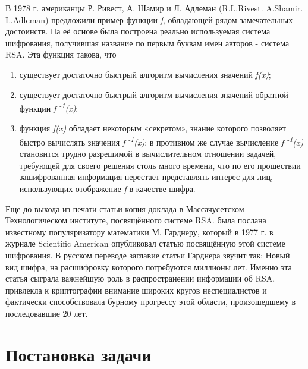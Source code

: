   В 1978 г. американцы Р. Ривест, А. Шамир и Л. Адлеман (R.L.Rivest. A.Shamir. L.Adleman) предложили пример функции \textit{f}, обладающей рядом 
замечательных достоинств. На её основе была построена реально используемая система шифрования, получившая название по первым буквам имен авторов - 
система RSA. Эта функция такова, что
\begin{enumerate}
    \item существует достаточно быстрый алгоритм вычисления значений \textit{f(x)};
    \item существует достаточно быстрый алгоритм вычисления значений обратной функции \textit{f\textsuperscript{ -1}(x)};
    \item функция \textit{f(x)} обладает некоторым «секретом», знание которого позволяет быстро вычислять значения \textit{f\textsuperscript{ -1}(x)};
в противном же случае вычисление \textit{f\textsuperscript{ -1}(x)} становится трудно разрешимой в вычислительном отношении задачей, требующей для 
своего решения столь много времени, что по его прошествии зашифрованная информация перестает представлять интерес для лиц, 
использующих отображение \textit{f} в качестве шифра.
\end{enumerate}	

  Еще до выхода из печати статьи копия доклада в Массачусетском Технологическом институте, посвящённого системе RSA. была послана известному 
популяризатору математики М. Гарднеру, который в 1977 г. в журнале Scientific American опубликовал статью посвящённую этой системе шифрования. 
В русском переводе заглавие статьи Гарднера звучит так: Новый вид шифра, на расшифровку которого потребуются миллионы лет. Именно эта статья сыграла 
важнейшую роль в распространении информации об RSA, привлекла к криптографии внимание широких кругов неспециалистов и фактически способствовала 
бурному прогрессу этой области, произошедшему в последовавшие 20 лет.

\section{Постановка задачи}